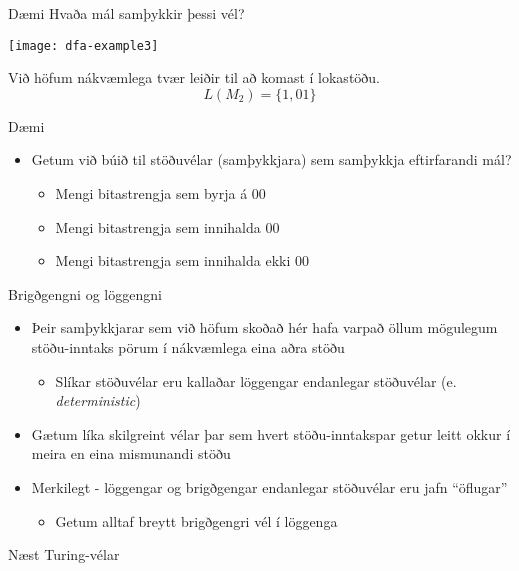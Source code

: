 \documentclass{beamer}
\begin{document}
\begin{frame}{Dæmi}
Hvaða mál samþykkir þessi vél?

\begin{center}
\texttt{[image: dfa-example3]}
\end{center}

\pause
Við höfum nákvæmlega tvær leiðir til að komast í lokastöðu.
\[
 L(M_2) = \{1,01\}
\]

\end{frame}

\begin{frame}{Dæmi}
\begin{itemize}
 \item Getum við búið til stöðuvélar (samþykkjara) sem samþykkja eftirfarandi mál?
 \begin{itemize}
  \item Mengi bitastrengja sem byrja á 00
  \item Mengi bitastrengja sem innihalda 00
  \item Mengi bitastrengja sem innihalda ekki 00
 \end{itemize}
\end{itemize}
\end{frame}

\begin{frame}{Brigðgengni og löggengni}
\begin{itemize}
 \item Þeir samþykkjarar sem við höfum skoðað hér hafa varpað öllum mögulegum stöðu-inntaks pörum í nákvæmlega eina aðra stöðu
 \begin{itemize}
  \item Slíkar stöðuvélar eru kallaðar löggengar endanlegar stöðuvélar (e. \emph{deterministic})
 \end{itemize}
 \item Gætum líka skilgreint vélar þar sem hvert stöðu-inntakspar getur leitt okkur í meira en eina mismunandi stöðu
 \item Merkilegt - löggengar og brigðgengar endanlegar stöðuvélar eru jafn ``öflugar''
 \begin{itemize}
  \item Getum alltaf breytt brigðgengri vél í löggenga
 \end{itemize}
\end{itemize}
\end{frame}

\begin{frame}{Næst}
Turing-vélar
\end{frame}
\end{document}
